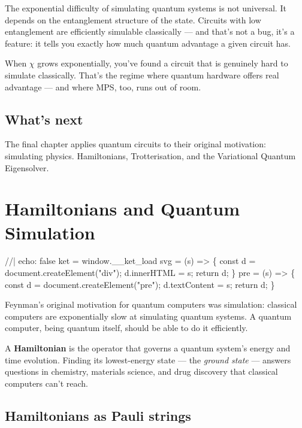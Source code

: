 \documentclass[
  11pt,
  letterpaper,
  oneside]{scrbook}
\newenvironment{Shaded}{\begin{snugshade}}{\end{snugshade}}
\newcommand{\NormalTok}[1]{\textcolor[rgb]{0.00,0.23,0.31}{#1}}
\begin{document}
The exponential difficulty of simulating quantum systems is not
universal. It depends on the entanglement structure of the state.
Circuits with low entanglement are efficiently simulable classically ---
and that's not a bug, it's a feature: it tells you exactly how much
quantum advantage a given circuit has.

When \(\chi\) grows exponentially, you've found a circuit that is
genuinely hard to simulate classically. That's the regime where quantum
hardware offers real advantage --- and where MPS, too, runs out of room.

\section{What's next}\label{whats-next-7}

The final chapter applies quantum circuits to their original motivation:
simulating physics. Hamiltonians, Trotterisation, and the Variational
Quantum Eigensolver.

\chapter{Hamiltonians and Quantum Simulation}\label{sec-hamiltonian}

\begin{Shaded}
\begin{Highlighting}[]
\NormalTok{//| echo: false}
\NormalTok{ket = window.\_\_ket\_load}
\NormalTok{svg = (s) =\textgreater{} \{ const d = document.createElement("div"); d.innerHTML = s; return d; \}}
\NormalTok{pre = (s) =\textgreater{} \{ const d = document.createElement("pre"); d.textContent = s; return d; \}}
\end{Highlighting}
\end{Shaded}

Feynman's original motivation for quantum computers was simulation:
classical computers are exponentially slow at simulating quantum
systems. A quantum computer, being quantum itself, should be able to do
it efficiently.

A \textbf{Hamiltonian} is the operator that governs a quantum system's
energy and time evolution. Finding its lowest-energy state --- the
\emph{ground state} --- answers questions in chemistry, materials
science, and drug discovery that classical computers can't reach.

\section{Hamiltonians as Pauli
strings}\label{hamiltonians-as-pauli-strings}
\end{document}
